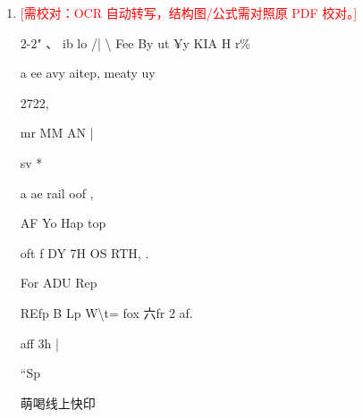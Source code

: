 \documentclass[UTF8,12pt,a4paper,openany]{ctexbook}
\newcommand{\TODO}[1]{\textcolor{red}{[需校对：#1]}}
\begin{document}
\begin{enumerate}[label=\textbf{\arabic*.},leftmargin=2em]
IO3TSCS\par 2414,     WY\par ave          < 4A               oy\par Ly                4X fu w= + waz A                  a\par |     a               wfe bY\par |                     =>     ¥      r\par |              Er                  “      ii a                         \textasciitilde{} ap")\par |                              wae\par \}                    \textbackslash{}                os  Wy\par 7M,\par \$e fe 42 XS 下 fe b kw\par |     和\par Nye Yew\par |                           Pour 4-24 2\par Ae        b     —> TR = ASE                                                  |\par f | 4\par i | Ra图GD)  机  "9 t ‘  FyR(KN)  ae a\par ;                                                                                               ae ee)\par CRO)\par 萌喝线上快印\par \par 【第 14 页，来源：ocr】\par RAR Stil\par RENE ODIGBISSS
\item \TODO{OCR 自动转写，结构图/公式需对照原 PDF 校对。}\par 2-2" 、             ib          lo              /| \textbackslash{}   Fee  By ut ¥y KIA H r\%\par a ee avy aitep, meaty uy\par 2722,\par mr       MM                                  AN                                              |\par sv                     *\par a ae rail oof                             ,\par AF Yo Hap top\par oft                 f   DY 7H OS RTH,                       .\par For ADU Rep\par REfp         B    Lp  W\textbackslash{}t= fox 六fr 2 af.\par aff               3h                                           |\par “Sp\par 萌喝线上快印
\end{enumerate}
\end{document}
